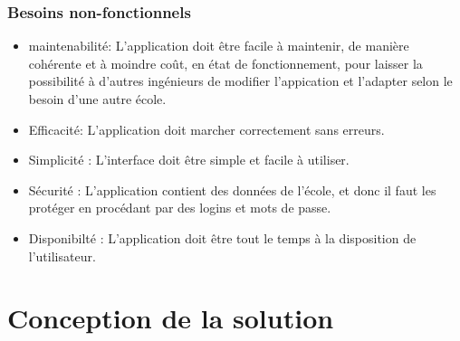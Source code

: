 \subsubsection{Besoins non-fonctionnels}
\begin{itemize}
  \item maintenabilité: L'application doit être facile à maintenir, de manière cohérente et à moindre coût, en état de fonctionnement, pour laisser la possibilité à d'autres ingénieurs de modifier l'appication et l'adapter selon le besoin d'une autre école.
  \item  Efficacité: L'application doit marcher correctement sans erreurs.
  \item  Simplicité : L'interface doit être simple et facile à utiliser.
  \item Sécurité : L'application contient des données de l'école, et donc il faut les protéger en procédant par des logins et mots de passe.
  \item Disponibilté : L'application doit être tout le temps à la disposition de l'utilisateur.
   
\end{itemize}  

\section{Conception de la solution}

